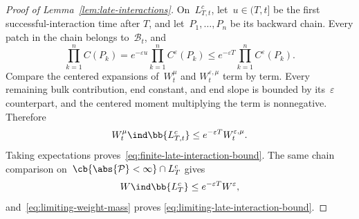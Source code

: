 \begin{proof}[Proof of Lemma~\ref{lem:late-interactions}]
On~$L_{T,t}^c$, let~$u\in(T,t]$ be the first successful-interaction time after
$T$, and let~$P_1,\ldots,P_n$ be its backward chain. Every patch in the chain
belongs to~$\mathcal B_t$, and
\begin{equation*}
\prod_{k=1}^n C(P_k)
=
e^{-\varepsilon u}
\prod_{k=1}^n C^\varepsilon(P_k)
\leq
e^{-\varepsilon T}
\prod_{k=1}^n C^\varepsilon(P_k).
\end{equation*}
Compare the centered expansions of~$W_t^\mu$ and
$W_t^{\varepsilon,\mu}$ term by term. Every remaining bulk contribution, end
constant, and end slope is bounded by its~$\varepsilon$ counterpart, and the
centered moment multiplying the term is nonnegative. Therefore
\begin{equation*}
W_t^\mu\ind\bb{L_{T,t}^c}
\leq
e^{-\varepsilon T}W_t^{\varepsilon,\mu}.
\end{equation*}
Taking expectations proves~\eqref{eq:finite-late-interaction-bound}. The same
chain comparison on~$\cb{\abs{\mathcal P}<\infty}\cap L_T^c$ gives
\begin{equation*}
W\ind\bb{L_T^c}
\leq
e^{-\varepsilon T}W^\varepsilon,
\end{equation*}
and~\eqref{eq:limiting-weight-mass} proves
\eqref{eq:limiting-late-interaction-bound}.
\end{proof}

